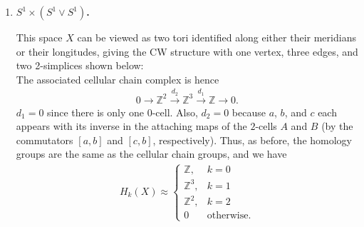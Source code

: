 \documentclass[a4paper,12pt]{article}
\begin{document}
\begin{enumerate}
\begin{enumerate}[label=(\alph*)]
            \item
                \boldmath\textbf{$S^1 \times (S^1 \lor S^1)$.
                }\unboldmath \par
                This space $X$ can be viewed as two tori identified along either their meridians or their longitudes, giving the CW structure with one vertex, three edges, and two 2-simplices shown below:
                \vspace{4cm} \\
                The associated cellular chain complex is hence
                \begin{align*}
                    0 \rightarrow \mathbb{Z}^2 \xrightarrow{d_2} \mathbb{Z}^3 \xrightarrow{d_1} \mathbb{Z} \rightarrow 0.
                \end{align*}
                $d_1 = 0$ since there is only one $0$-cell. Also, $d_2 = 0$ because $a$, $b$, and $c$ each appears with its inverse in the attaching maps of the $2$-cells $A$ and $B$ (by the commutators $[a, b]$ and $[c, b]$, respectively). Thus, as before, the homology groups are the same as the cellular chain groups, and we have
                \begin{align*}
                    H_k(X) \approx \begin{cases}
                        \mathbb{Z}, &k = 0 \\
                        \mathbb{Z}^3, &k = 1 \\
                        \mathbb{Z}^2, &k = 2 \\
                        0 &\text{otherwise}.
                    \end{cases}
                \end{align*}


\end{enumerate}
\end{enumerate}
\end{document}
